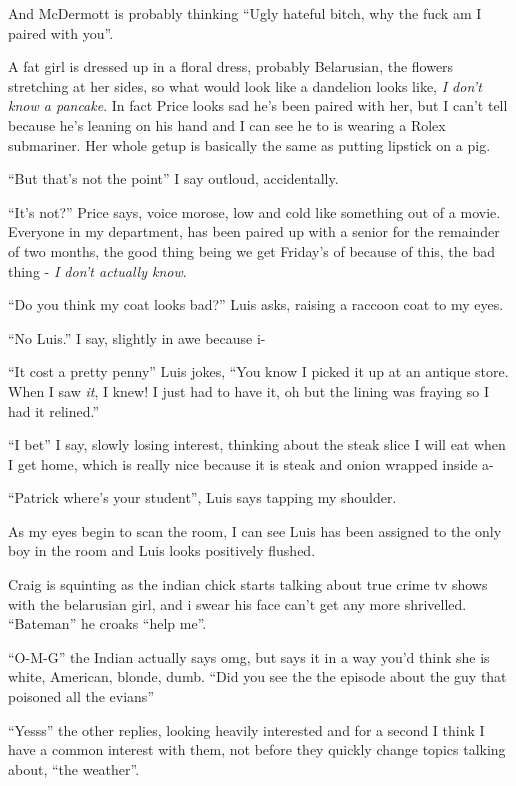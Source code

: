\documentclass[19pt,openany]{book}
\begin{document}
And McDermott is probably thinking ``Ugly hateful bitch,
why the fuck am I paired with you''.

A fat girl is dressed up in a floral dress, probably
Belarusian, the flowers stretching
at her sides, so what would look like a dandelion looks
like, \textit{I don't know a pancake}.
In fact Price looks sad he's been paired with her, but
I can't tell because he's leaning on his hand and I can
see he to is wearing a Rolex submariner.
Her whole
getup is basically the same as putting lipstick on a pig.

``But that's not the point'' I
say outloud, accidentally.

``It's not?'' Price says, voice morose, low and cold like something
out of a movie.
Everyone in my department, has been paired up with a senior
for the remainder of two months, the good thing being we get Friday's
of because of this, the bad thing - \textit{I don't actually know}.

``Do you think my coat looks bad?'' Luis asks, raising a raccoon coat
to my eyes.

``No Luis.'' I say, slightly in awe because i-

``It cost a pretty penny'' Luis jokes, ``You know I
picked it up at an antique store. When I saw \textit{it}, I
knew! I just had to have it, oh but the lining was fraying
so I had it relined.''

``I bet'' I say, slowly losing interest, thinking about the
steak slice I will eat when I get home, which is really
nice because it is steak and onion wrapped inside a-

``Patrick
where's your student'', Luis says tapping my shoulder.

As my eyes begin to scan the room, I can
see Luis has been assigned to the only boy in the
room and Luis looks positively flushed.

Craig is squinting as the indian chick starts
talking about true crime tv shows with the belarusian girl, and i swear his face can't get any
more shrivelled.  ``Bateman'' he croaks ``help me''.

``O-M-G'' the Indian actually says omg, but says it in a way
you'd think she is white, American, blonde, dumb. ``Did you
see the the episode about the guy that poisoned all the evians''

``Yesss'' the other replies, looking heavily interested and
for a second I think I have a common interest with them, not before
they quickly change topics talking about, ``the weather''.
\end{document}
